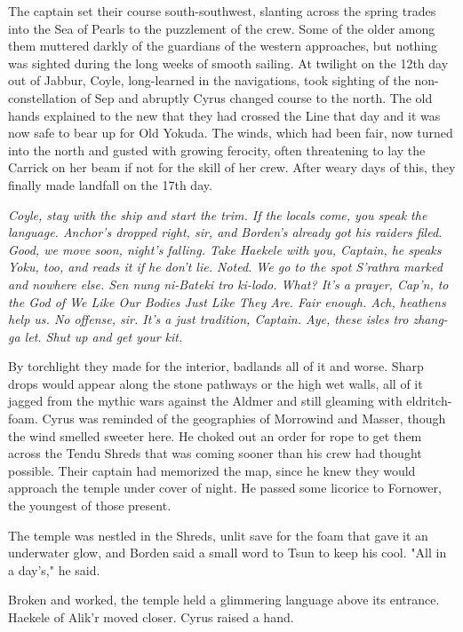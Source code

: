 The captain set their course south-southwest, slanting across the spring trades into the Sea of Pearls to the puzzlement of the crew. Some of the older among them muttered darkly of the guardians of the western approaches, but nothing was sighted during the long weeks of smooth sailing. At twilight on the 12th day out of Jabbur, Coyle, long-learned in the navigations, took sighting of the non-constellation of Sep and abruptly Cyrus changed course to the north. The old hands explained to the new that they had crossed the Line that day and it was now safe to bear up for Old Yokuda. The winds, which had been fair, now turned into the north and gusted with growing ferocity, often threatening to lay the Carrick on her beam if not for the skill of her crew. After weary days of this, they finally made landfall on the 17th day.

\parabreak

\textit{Coyle, stay with the ship and start the trim. If the locals come, you speak the language. Anchor’s dropped right, sir, and Borden’s already got his raiders filed. Good, we move soon, night’s falling. Take Haekele with you, Captain, he speaks Yoku, too, and reads it if he don’t lie. Noted. We go to the spot S’rathra marked and nowhere else. Sen nung ni-Bateki tro ki-lodo. What? It’s a prayer, Cap’n, to the God of We Like Our Bodies Just Like They Are. Fair enough. Ach, heathens help us. No offense, sir. It’s a just tradition, Captain. Aye, these isles tro zhang-ga let. Shut up and get your kit.}

\parabreak

By torchlight they made for the interior, badlands all of it and worse. Sharp drops would appear along the stone pathways or the high wet walls, all of it jagged from the mythic wars against the Aldmer and still gleaming with eldritch-foam. Cyrus was reminded of the geographies of Morrowind and Masser, though the wind smelled sweeter here. He choked out an order for rope to get them across the Tendu Shreds that was coming sooner than his crew had thought possible. Their captain had memorized the map, since he knew they would approach the temple under cover of night. He passed some licorice to Fornower, the youngest of those present.

The temple was nestled in the Shreds, unlit save for the foam that gave it an underwater glow, and Borden said a small word to Tsun to keep his cool. "All in a day’s," he said.

Broken and worked, the temple held a glimmering language above its entrance. Haekele of Alik’r moved closer. Cyrus raised a hand.

